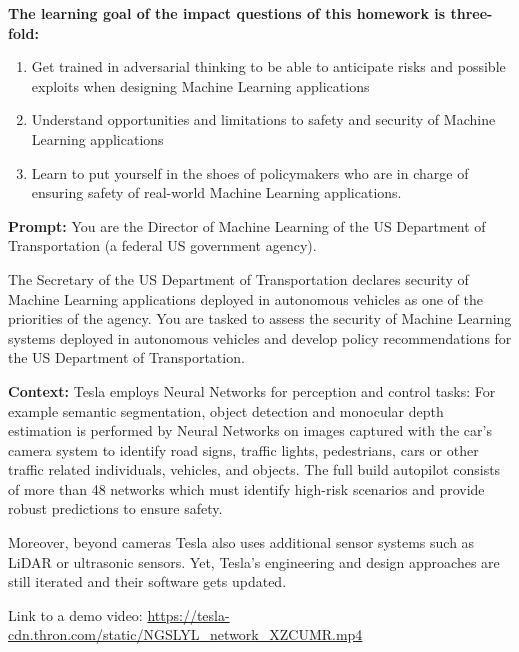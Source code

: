 \documentclass[submit]{harvardml}
\begin{document}

\begin{problem}

\textbf{The learning goal of the impact questions of this homework is
three-fold: }

\begin{enumerate}
\item
  Get trained in adversarial thinking to be able to anticipate risks and
  possible exploits when designing Machine Learning applications
\item
  Understand opportunities and limitations to safety and security of
  Machine Learning applications
\item
  Learn to put yourself in the shoes of policymakers who are in charge
  of ensuring safety of real-world Machine Learning applications.
\end{enumerate}

\textbf{Prompt: }You are the Director of Machine Learning of the US
Department of Transportation (a federal US government agency).

The Secretary of the US Department of Transportation declares security
of Machine Learning applications deployed in autonomous vehicles as one
of the priorities of the agency. You are tasked to assess the security
of Machine Learning systems deployed in autonomous vehicles and develop
policy recommendations for the US Department of Transportation.

\textbf{Context: }Tesla employs Neural Networks for perception and
control tasks: For example semantic segmentation, object detection and
monocular depth estimation is performed by Neural Networks on images
captured with the car's camera system to identify road signs, traffic
lights, pedestrians, cars or other traffic related individuals,
vehicles, and objects. The full build autopilot consists of more than 48
networks which must identify high-risk scenarios and provide robust
predictions to ensure safety.

Moreover, beyond cameras Tesla also uses additional sensor systems such
as LiDAR or ultrasonic sensors. Yet, Tesla's engineering and design
approaches are still iterated and their software gets updated.

Link to a demo video: \url{https://tesla-cdn.thron.com/static/NGSLYL_network_XZCUMR.mp4}


\end{problem}
\end{document}
